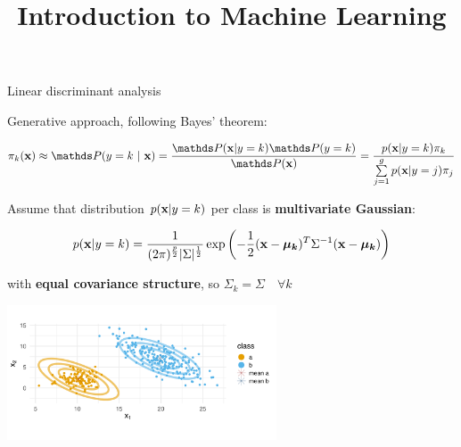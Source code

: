 \documentclass[11pt,compress,t,notes=noshow, xcolor=table]{beamer}
\title{Introduction to Machine Learning}
\begin{document}

\begin{vbframe}{Linear discriminant analysis}

\begin{small}
Generative approach, following Bayes' theorem:

$$\pikx \approx \postk = \frac{\P(\xv | y = k) \P(y = k)}{\P(\xv)} = \frac{\pdfxyk \pik}{\sumjg \pdfxyk[j] \pi_j}$$

Assume that distribution $p(\mathbf{x} | y= k)$ per class is  \textbf{multivariate Gaussian}:

$$
p(\mathbf{x} | y= k) = \frac{1}{(2\pi)^{\frac{p}{2}}|\Sigma|^{\frac{1}{2}}} \exp\left(-\frac{1}{2}(\mathbf{x} - \bm{\mu_{k}})^T \Sigma^{-1} (\mathbf{x} - \bm{\mu_{k}})\right)
$$

with \textbf{equal covariance structure}, so $\Sigma_k = \Sigma \quad \forall k$
\end{small}

\vspace{-0.9em}
\begin{center}
\includegraphics[width=0.60\textwidth, clip=true, trim={0 75 0 45}]{figure/disc_analysis-lda_2.png}
\end{center}
\end{vbframe}
\end{document}
